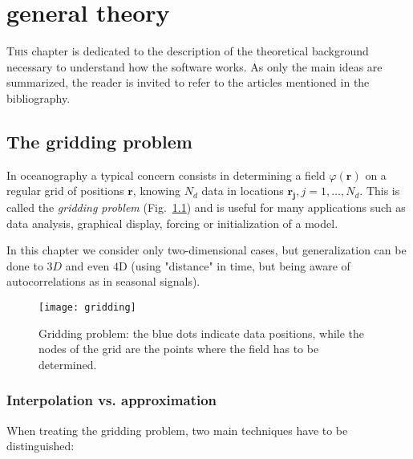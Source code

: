 \chapter{\diva\divaspace general theory\label{chaptheory}}
\vspace*{-2cm}
\lettrine[lines=2, loversize=-0.1, lraise=0.1]{T}{his} chapter is dedicated to the description of the theoretical background necessary to understand how the \diva software works. As only the main ideas are summarized, the reader is invited to refer to the articles mentioned in the bibliography.

\minitoc


\section{The gridding problem\label{gridding}}

In oceanography a typical concern consists in determining a field $\varphi(\mathbf{r})$ on a regular grid of positions $\mathbf{r}$, knowing $N_{d}$ data in locations $\mathbf{r_{j}}, j=1,\ldots, N_{d}$. This is called the \textit{gridding problem} (Fig.~\ref{gridproblem}) and is useful for many applications such as data analysis, graphical display, forcing or initialization of a model.

In this chapter we consider only two-dimensional cases, but generalization can be done to $3D$ and even $4$D (using "distance" in time, but being aware of autocorrelations as in seasonal signals).

\begin{figure}[htpb]
	\centering
	\parbox{.5\textwidth}{
		\texttt{[image: gridding]}
		}\parbox{.5\textwidth}{
		\caption{Gridding problem: the blue dots indicate data positions, while the nodes of the grid  are the points where the field has to be determined.\label{gridproblem}}
		}
\end{figure}


\subsection{Interpolation vs. approximation}

When treating the gridding problem, two main techniques have to be distinguished:

